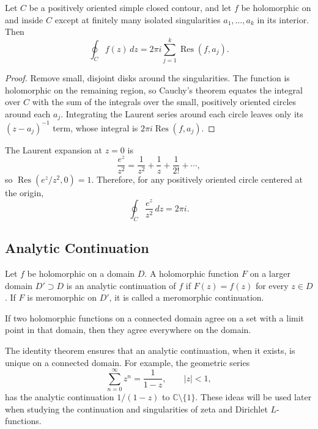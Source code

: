 \begin{theorem}
Let $C$ be a positively oriented simple closed contour, and let $f$ be holomorphic on and inside $C$ except at finitely many isolated singularities $a_1,\ldots,a_k$ in its interior. Then
\[
 \oint_C f(z)\,dz=2\pi i\sum_{j=1}^{k}\operatorname{Res}(f,a_j).
\]
\end{theorem}

\begin{proof}
Remove small, disjoint disks around the singularities. The function is holomorphic on the remaining region, so Cauchy's theorem equates the integral over $C$ with the sum of the integrals over the small, positively oriented circles around each $a_j$. Integrating the Laurent series around each circle leaves only its $(z-a_j)^{-1}$ term, whose integral is $2\pi i\operatorname{Res}(f,a_j)$.
\end{proof}

\begin{example}
The Laurent expansion at $z=0$ is
\[
 \frac{e^z}{z^2}=\frac{1}{z^2}+\frac{1}{z}+\frac{1}{2!}+\cdots,
\]
so $\operatorname{Res}(e^z/z^2,0)=1$. Therefore, for any positively oriented circle centered at the origin,
\[
 \oint_C\frac{e^z}{z^2}\,dz=2\pi i.
\]
\end{example}

\subsection{Analytic Continuation}

\begin{definition}
Let $f$ be holomorphic on a domain $D$. A holomorphic function $F$ on a larger domain $D'\supset D$ is an analytic continuation of $f$ if $F(z)=f(z)$ for every $z\in D$. If $F$ is meromorphic on $D'$, it is called a meromorphic continuation.
\end{definition}

\begin{theorem}
If two holomorphic functions on a connected domain agree on a set with a limit point in that domain, then they agree everywhere on the domain.
\end{theorem}

The identity theorem ensures that an analytic continuation, when it exists, is unique on a connected domain. For example, the geometric series
\[
 \sum_{n=0}^{\infty}z^n=\frac{1}{1-z},\qquad |z|<1,
\]
has the analytic continuation $1/(1-z)$ to $\mathbb{C}\setminus\{1\}$. These ideas will be used later when studying the continuation and singularities of zeta and Dirichlet $L$-functions.
